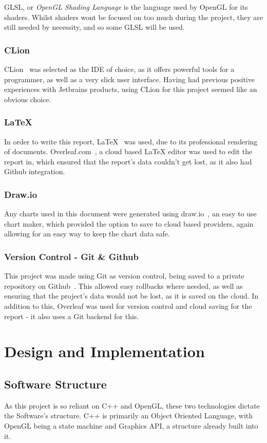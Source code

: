 \documentclass[a4paper,10pt]{report}
\begin{document}
GLSL, or \textit{OpenGL Shading Language} is the language used by OpenGL for its shaders. Whilst shaders wont be focused on too much during the project, they are still needed by necessity, and so some GLSL will be used.

\subsection{CLion}
CLion~\cite{clion_jetbrains} was selected as the IDE of choice, as it offers powerful tools for a programmer, as well as a very slick user interface. Having had previous positive experiences with Jetbrains products, using CLion for this project seemed like an obvious choice.

\subsection{LaTeX}
In order to write this report, LaTeX~\cite{latex_website} was used, due to its professional rendering of documents. Overleaf.com~\cite{overleaf_website}, a cloud based LaTeX editor was used to edit the report in, which ensured that the report's data couldn't get lost, as it also had Github integration.

\subsection{Draw.io}
Any charts used in this document were generated using draw.io~\cite{draw_io}, an easy to use chart maker, which provided the option to save to cloud based providers, again allowing for an easy way to keep the chart data safe. 

\subsection{Version Control - Git \& Github}
This project was made using Git as version control, being saved to a private repository on Github~\cite{github}. This allowed easy rollbacks where needed, as well as ensuring that the project's data would not be lost, as it is saved on the cloud. In addition to this, Overleaf was used for version control and cloud saving for the report - it also uses a Git backend for this.


\chapter{Design and Implementation}

\section{Software Structure}
As this project is so reliant on C++ and OpenGL, these two technologies dictate the Software's structure. C++ is primarily an Object Oriented Language, with OpenGL being a state machine and Graphics API, a structure already built into it. 
\end{document}
